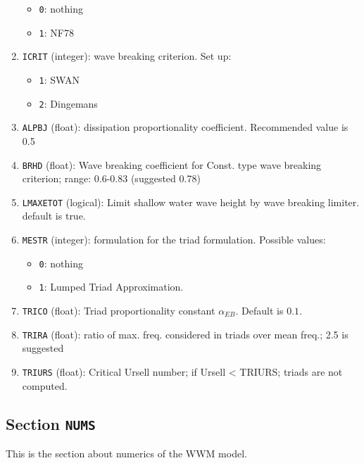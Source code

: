 \documentclass[12pt]{amsart}
\begin{document}
\begin{enumerate}
  \begin{itemize}
  \item {\tt 0}: nothing
  \item {\tt 1}: NF78
  \end{itemize}
\item {\tt ICRIT} (integer): wave breaking criterion. Set up:
  \begin{itemize}
  \item {\tt 1}: SWAN
  \item {\tt 2}: Dingemans
  \end{itemize}
\item {\tt ALPBJ} (float): dissipation proportionality coefficient. Recommended value is 0.5
\item {\tt BRHD} (float): Wave breaking coefficient for Const. type wave breaking criterion; range: 0.6-0.83 (suggested 0.78)
\item {\tt LMAXETOT} (logical): Limit shallow water wave height by wave breaking limiter. default is true.
\item {\tt MESTR} (integer): formulation for the triad formulation. Possible values:
  \begin{itemize}
  \item {\tt 0}: nothing
  \item {\tt 1}: Lumped Triad Approximation.
  \end{itemize}
\item {\tt TRICO} (float): Triad proportionality constant $\alpha_{EB}$. Default is $0.1$.
\item {\tt TRIRA} (float): ratio of max. freq. considered in triads over mean freq.; 2.5 is suggested
\item {\tt TRIURS} (float): Critical Ursell number; if Ursell < TRIURS; triads are not computed.
\end{enumerate}




\subsection{Section {\tt NUMS}}
This is the section about numerics of the WWM model.
\end{document}
